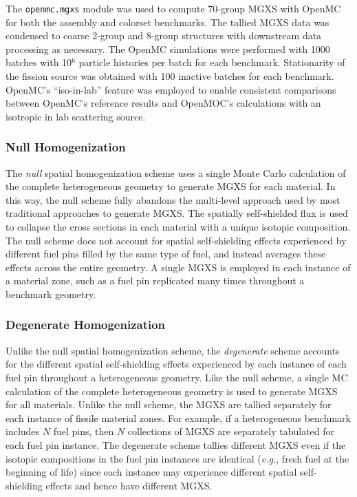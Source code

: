 The \texttt{openmc.mgxs} module was used to compute 70-group MGXS with OpenMC for both the assembly and colorset benchmarks. The tallied MGXS data was condensed to coarse 2-group and 8-group structures with downstream data processing as necessary. The OpenMC simulations were performed with 1000 batches with 10$^{6}$ particle histories per batch for each benchmark. Stationarity of the fission source was obtained with 100 inactive batches for each benchmark. OpenMC's ``iso-in-lab'' feature was employed to enable consistent comparisons between OpenMC's reference results and OpenMOC's calculations with an isotropic in lab scattering source.

\subsubsection{Null Homogenization}
\label{subsubsec:homogenize-null}

The \textit{null} spatial homogenization scheme uses a single Monte Carlo calculation of the complete heterogeneous geometry to generate MGXS for each material. In this way, the null scheme fully abandons the multi-level approach used by most traditional approaches to generate MGXS. The spatially self-shielded flux is used to collapse the cross sections in each material with a unique isotopic composition. The null scheme does not account for spatial self-shielding effects experienced by different fuel pins filled by the same type of fuel, and instead averages these effects across the entire geometry. A single MGXS is employed in each instance of a material zone, such as a fuel pin replicated many times throughout a benchmark geometry.

\subsubsection{Degenerate Homogenization}
\label{subsubsec:homogenize-degenerate}

Unlike the null spatial homogenization scheme, the \textit{degenerate} scheme accounts for the different spatial self-shielding effects experienced by each instance of each fuel pin throughout a heterogeneous geometry. Like the null scheme, a single MC calculation of the complete heterogeneous geometry is used to generate MGXS for all materials. Unlike the null scheme, the MGXS are tallied separately for each instance of fissile material zones. For example, if a heterogeneous benchmark includes $N$ fuel pins, then $N$ collections of MGXS are separately tabulated for each fuel pin instance. The degenerate scheme tallies different MGXS even if the isotopic compositions in the fuel pin instances are identical (\textit{e.g.}, fresh fuel at the beginning of life) since each instance may experience different spatial self-shielding effects and hence have different MGXS.


